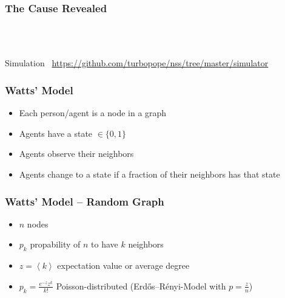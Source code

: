 \documentclass[slidestop,usenames,dvipsnames]{beamer}
\newcommand{\fitem}{\pause\vfill\item}
\newcommand{\gitem}{\vfill\item}
\begin{document}
\begin{frame}
    \frametitle{The Cause Revealed}
    \vfill
    \begin{center}
        \\
        \vspace{20pt}
        \\
        \vspace{20pt}
    \end{center}
    \vfill
\end{frame}

\begin{frame}
    \vfill
    \begin{center}
        {\Huge Simulation}\
        \vfill
        \url{https://github.com/turbopope/nss/tree/master/simulator}
    \end{center}
\end{frame}



\begin{frame}
    \frametitle{Watts' Model}
    \begin{itemize}
        \gitem Each person/agent is a node in a graph
        \gitem Agents have a state $\in \lbrace 0, 1 \rbrace$
        \gitem Agents observe their neighbors
        \gitem Agents change to a state if a fraction of their neighbors has that state
    \end{itemize}
    \vfill
\end{frame}

\begin{frame}
    \frametitle{Watts' Model -- Random Graph}
    \begin{itemize}
        \fitem $n$ nodes
        \fitem $p_k$ propability of $n$ to have $k$ neighbors
        \fitem $z = \left<k\right>$ expectation value or average degree
        \fitem $p_k = \frac{e^{-z}z^k}{k!}$ Poisson-distributed (Erdős–Rényi-Model with $p = \frac{z}{n}$)
    \end{itemize}
    \vfill
\end{frame}
\end{document}
